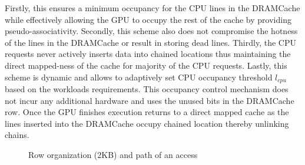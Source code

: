 \par Firstly, this ensures a minimum occupancy for the CPU lines in the DRAMCache while effectively allowing the GPU to occupy the rest of the cache by providing pseudo-associativity. Secondly, this scheme also does not compromise the hotness of the lines in the DRAMCache or result in storing dead lines. Thirdly, the CPU requests never actively inserts data into chained locations thus maintaining the direct mapped-ness of the cache for majority of the CPU requests. Lastly, this scheme is dynamic and allows to adaptively set CPU occupancy threshold \textit{$l_{cpu}$} based on the workloads requirements. This occupancy control mechanism does not incur any additional hardware and uses the unused bits in the DRAMCache row. Once the GPU finishes execution \cachename returns to a direct mapped cache as the lines inserted into the DRAMCache occupy chained location thereby unlinking chains. 


\begin{figure*}[!htb]
    \centering
    \chainaccess
    \caption{\cachename Row organization (2KB) and path of an access}
    \label{fig:chain-access}
\end{figure*}
